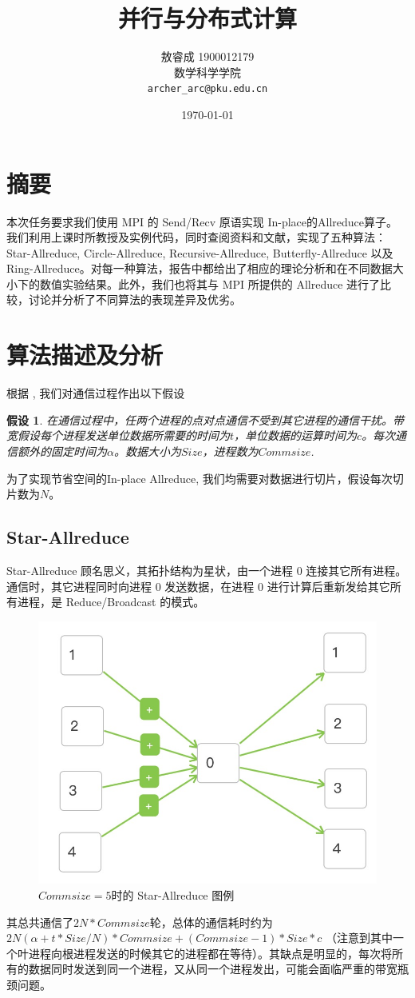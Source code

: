 \documentclass{article}
\title{并行与分布式计算}
\date{\today}
\author{
	敖睿成 1900012179\\
	数学科学学院\\
	\texttt{archer\_arc@pku.edu.cn} \\
}
\newtheorem{假设}{假设}
\begin{document}
	\maketitle
	\thispagestyle{fancy}
	\tableofcontents
	\section{摘要}
	本次任务要求我们使用 MPI 的 Send/Recv 原语实现 In-place的Allreduce算子。我们利用上课时所教授及实例代码，同时查阅资料和文献\cite{cai2021synthesizing,gibiansky2017bringing,sergeev2018horovod,allreduce}，实现了五种算法：Star-Allreduce, Circle-Allreduce, Recursive-Allreduce,  Butterfly-Allreduce 以及 Ring-Allreduce。对每一种算法，报告中都给出了相应的理论分析和在不同数据大小下的数值实验结果。此外，我们也将其与 MPI 所提供的 Allreduce 进行了比较，讨论并分析了不同算法的表现差异及优劣。
	
	\section{算法描述及分析}
		
	根据 \cite{allreduce}, 我们对通信过程作出以下假设
	\begin{假设}
		在通信过程中，任两个进程的点对点通信不受到其它进程的通信干扰。带宽假设每个进程发送单位数据所需要的时间为$t$，单位数据的运算时间为$c$。每次通信额外的固定时间为$\alpha$。数据大小为$Size$，进程数为$Commsize$.
	\end{假设}
为了实现节省空间的In-place Allreduce, 我们均需要对数据进行切片，假设每次切片数为$N$。  
\subsection{Star-Allreduce}
Star-Allreduce 顾名思义，其拓扑结构为星状，由一个进程 0 连接其它所有进程。通信时，其它进程同时向进程 0 发送数据，在进程 0 进行计算后重新发给其它所有进程，是 Reduce/Broadcast 的模式。
\begin{figure}[H]
			\centering
	\includegraphics[width=0.6\linewidth]{./fig/star}
	\caption{$Commsize = 5$时的 Star-Allreduce 图例\label{fig:star}}
\end{figure}
其总共通信了$2N*Commsize$轮，总体的通信耗时约为 $2N(\alpha+t*Size/N)*Commsize+(Commsize-1)*Size*c$ （注意到其中一个叶进程向根进程发送的时候其它的进程都在等待）。其缺点是明显的，每次将所有的数据同时发送到同一个进程，又从同一个进程发出，可能会面临严重的带宽瓶颈问题。
\end{document}
